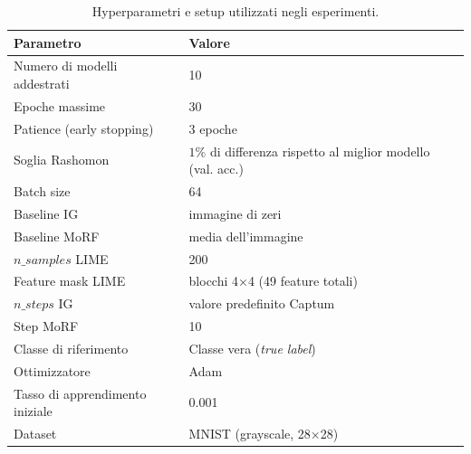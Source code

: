 \documentclass[12pt,a4paper,oneside]{report}
\numberwithin{figure}{chapter}
\numberwithin{table}{chapter}
\begin{document}
\begin{table}[H]
      \centering
      \renewcommand{\arraystretch}{1.2}
      \begin{tabular}{ll}
            \hline
            \textbf{Parametro}              & \textbf{Valore}                                             \\
            \hline
            Numero di modelli addestrati    & 10                                                          \\
            Epoche massime                  & 30                                                          \\
            Patience (early stopping)       & 3 epoche                                                    \\
            Soglia Rashomon                 & $1\%$ di differenza rispetto al miglior modello (val. acc.) \\
            Batch size                      & 64                                                          \\
            Baseline IG                     & immagine di zeri                                            \\
            Baseline MoRF                   & media dell’immagine                                         \\
            $n\_samples$ LIME               & 200                                                         \\
            Feature mask LIME               & blocchi 4×4 (49 feature totali)                             \\
            $n\_steps$ IG                   & valore predefinito Captum                                   \\
            Step MoRF                       & 10                                                          \\
            Classe di riferimento           & Classe vera (\textit{true label})                           \\
            Ottimizzatore                   & Adam                                                        \\
            Tasso di apprendimento iniziale & 0.001                                                       \\
            Dataset                         & MNIST (grayscale, 28×28)                                    \\
            \hline
      \end{tabular}
      \caption{Hyperparametri e setup utilizzati negli esperimenti.}
      \label{tab:hyperparams}
\end{table}
\end{document}
